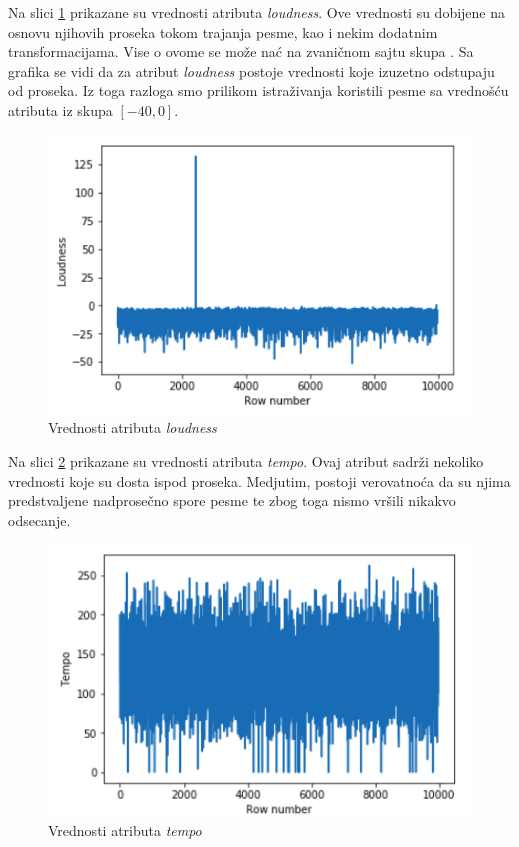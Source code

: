 Na slici \ref{fig:loudness} prikazane su vrednosti atributa \emph{loudness}. Ove vrednosti su dobijene na osnovu njihovih proseka tokom trajanja pesme, kao i nekim dodatnim transformacijama. Vise o ovome se mo\v{z}e na\'c{} na zvani\v{c}nom sajtu skupa \cite{Dataset}. Sa grafika se vidi da za atribut \emph{loudness} postoje vrednosti koje izuzetno odstupaju od proseka. Iz toga razloga smo prilikom istra\v{z}ivanja koristili pesme sa vredno\v{s}\'c{}u atributa iz skupa $[-40, 0]$.

\begin{figure}[H]
    \centering
    \includegraphics[scale=0.55]{resources/loudness.png}
    \caption{Vrednosti atributa \emph{loudness}}
    \label{fig:loudness}
\end{figure}

Na slici \ref{fig:tempo} prikazane su vrednosti atributa \emph{tempo}. Ovaj atribut sadr\v{z}i nekoliko vrednosti koje su dosta ispod proseka. Medjutim, postoji verovatno\'c{}a da su njima predstvaljene nadprose\v{c}no spore pesme te zbog toga nismo vr\v{s}ili nikakvo odsecanje.

\begin{figure}[H]
    \centering
    \includegraphics[scale=0.6]{resources/tempo.png}
    \caption{Vrednosti atributa \emph{tempo}}
    \label{fig:tempo}
\end{figure}

